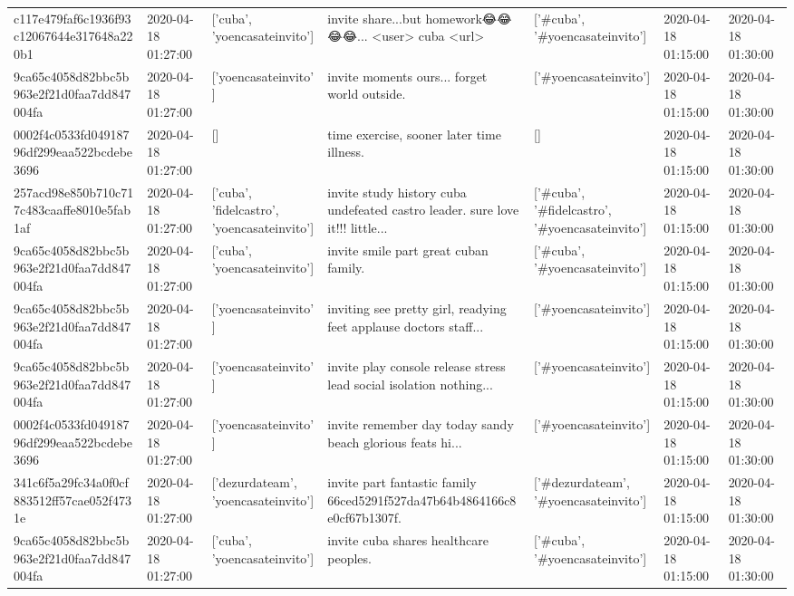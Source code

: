 \begin{tabular}{lllllll}
c117e479faf6c1936f93c12067644e317648a220b1 & 2020-04-18 01:27:00 & ['cuba', 'yoencasateinvito'] & invite share...but homework😂😂😂😂... <user> cuba <url> & ['#cuba', '#yoencasateinvito'] & 2020-04-18 01:15:00 & 2020-04-18 01:30:00 \\
9ca65c4058d82bbc5b963e2f21d0faa7dd847004fa & 2020-04-18 01:27:00 & ['yoencasateinvito'] & invite moments ours... forget world outside. & ['#yoencasateinvito'] & 2020-04-18 01:15:00 & 2020-04-18 01:30:00 \\
0002f4c0533fd04918796df299eaa522bcdebe3696 & 2020-04-18 01:27:00 & [] & time exercise, sooner later time illness. & [] & 2020-04-18 01:15:00 & 2020-04-18 01:30:00 \\
257acd98e850b710c717c483caaffe8010e5fab1af & 2020-04-18 01:27:00 & ['cuba', 'fidelcastro', 'yoencasateinvito'] & invite study history cuba undefeated castro leader. sure love it!!! little... & ['#cuba', '#fidelcastro', '#yoencasateinvito'] & 2020-04-18 01:15:00 & 2020-04-18 01:30:00 \\
9ca65c4058d82bbc5b963e2f21d0faa7dd847004fa & 2020-04-18 01:27:00 & ['cuba', 'yoencasateinvito'] & invite smile part great cuban family. & ['#cuba', '#yoencasateinvito'] & 2020-04-18 01:15:00 & 2020-04-18 01:30:00 \\
9ca65c4058d82bbc5b963e2f21d0faa7dd847004fa & 2020-04-18 01:27:00 & ['yoencasateinvito'] & inviting see pretty girl, readying feet applause doctors staff... & ['#yoencasateinvito'] & 2020-04-18 01:15:00 & 2020-04-18 01:30:00 \\
9ca65c4058d82bbc5b963e2f21d0faa7dd847004fa & 2020-04-18 01:27:00 & ['yoencasateinvito'] & invite play console release stress lead social isolation nothing... & ['#yoencasateinvito'] & 2020-04-18 01:15:00 & 2020-04-18 01:30:00 \\
0002f4c0533fd04918796df299eaa522bcdebe3696 & 2020-04-18 01:27:00 & ['yoencasateinvito'] & invite remember day today sandy beach glorious feats hi... & ['#yoencasateinvito'] & 2020-04-18 01:15:00 & 2020-04-18 01:30:00 \\
341c6f5a29fc34a0f0cf883512ff57cae052f4731e & 2020-04-18 01:27:00 & ['dezurdateam', 'yoencasateinvito'] & invite part fantastic family 66ced5291f527da47b64b4864166c8e0cf67b1307f. & ['#dezurdateam', '#yoencasateinvito'] & 2020-04-18 01:15:00 & 2020-04-18 01:30:00 \\
9ca65c4058d82bbc5b963e2f21d0faa7dd847004fa & 2020-04-18 01:27:00 & ['cuba', 'yoencasateinvito'] & invite cuba shares healthcare peoples. & ['#cuba', '#yoencasateinvito'] & 2020-04-18 01:15:00 & 2020-04-18 01:30:00 \\

\end{tabular}

